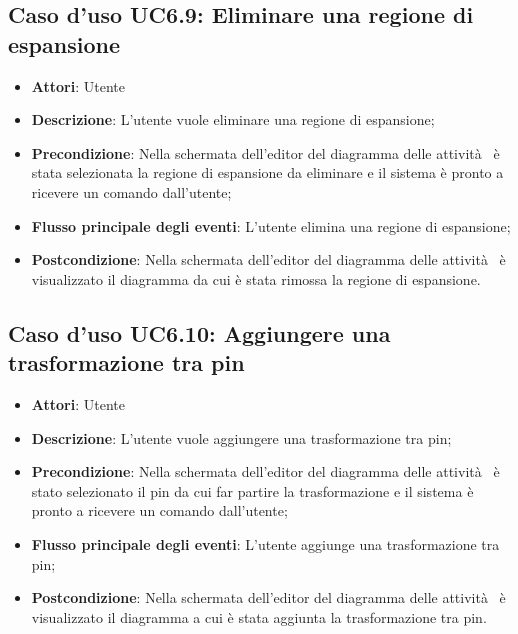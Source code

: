 \documentclass[../AnalisiDeiRequisiti.tex]{subfiles}
\begin{document}
				\subsection{Caso d'uso UC6.9: Eliminare una regione di espansione}
				\begin{itemize}
					\item \textbf{Attori}: Utente
					\item \textbf{Descrizione}: L'utente vuole eliminare una regione di espansione;
					\item \textbf{Precondizione}: Nella schermata dell'editor del diagramma delle attività  è stata selezionata la regione di espansione da eliminare e il sistema è pronto a ricevere un comando dall'utente;
					\item \textbf{Flusso principale degli eventi}: L'utente elimina una regione di espansione;
					\item \textbf{Postcondizione}: Nella schermata dell'editor del diagramma delle attività  è visualizzato il diagramma da cui è stata rimossa la regione di espansione.
				\end{itemize}
				\subsection{Caso d'uso UC6.10: Aggiungere una trasformazione tra pin}
				\begin{itemize}
					\item \textbf{Attori}: Utente
					\item \textbf{Descrizione}: L'utente vuole aggiungere una trasformazione tra pin;
					\item \textbf{Precondizione}: Nella schermata dell'editor del diagramma delle attività  è stato selezionato il pin da cui far partire la trasformazione e il sistema è pronto a ricevere un comando dall'utente;
					\item \textbf{Flusso principale degli eventi}: L'utente aggiunge una trasformazione tra pin;
					\item \textbf{Postcondizione}: Nella schermata dell'editor del diagramma delle attività  è visualizzato il diagramma a cui è stata aggiunta la trasformazione tra pin.
				\end{itemize}
\end{document}
